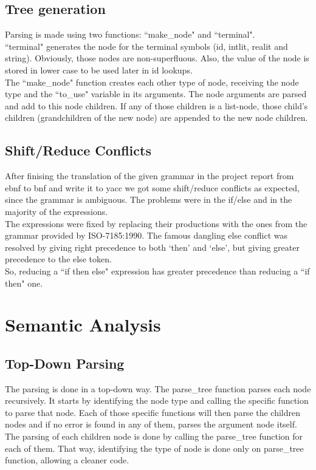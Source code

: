 \documentclass[12pt]{article}
\begin{document}
\subsection{Tree generation}

Parsing is made using two functions: ``make\_node" and ``terminal". \\
``terminal" generates the node for the terminal symbols (id, intlit, realit and string). Obviously, those nodes are non-superfluous. Also, the value of the node is stored in lower case to be used later in id lookups.\\
The ``make\_node" function creates each other type of node, receiving the node type and the ``to\_use" variable in its arguments. The node arguments are parsed and add to this node children. If any of those children is a list-node, those child's children (grandchildren of the new node) are appended to the new node children.\\

\subsection{Shift/Reduce Conflicts}

After finising the translation of the given grammar in the project report from ebnf to bnf and write it to yacc we got some shift/reduce conflicts as expected, since the grammar is ambiguous. The problems were in the if/else and in the majority of the expressions. \\
The expressions were fixed by replacing their productions with the ones from the grammar provided by ISO-7185:1990. The famous dangling else conflict was resolved by giving right precedence to both `then' and `else', but giving greater precedence to the else token. \\
So, reducing a ``if then else" expression has greater precedence than reducing a ``if then" one. \\


\section{Semantic Analysis}

\subsection{Top-Down Parsing}

The parsing is done in a top-down way. The parse\_tree function parses each node recursively. It starts by identifying the node type and calling the specific function to parse that node. Each of those specific functions will then parse the children nodes and if no error is found in any of them, parses the argument node itself. The parsing of each children node is done by calling the parse\_tree function for each of them. That way, identifying the type of node is done only on parse\_tree function, allowing a cleaner code.\\
\end{document}
